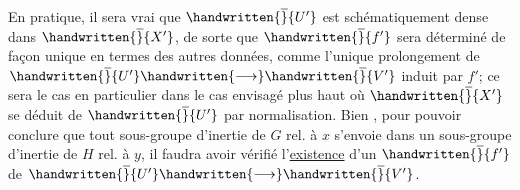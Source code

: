 
En pratique, il sera vrai que $\handwritten{\overline}{U'}$ est schématiquement dense dans $\handwritten{\overline}{X'}$, de sorte que $\handwritten{\overline}{f'}$ sera déterminé de façon unique en termes des autres données, comme l'unique prolongement de $\handwritten{\overline}{U'}\handwritten{\longrightarrow}\handwritten{\overline}{V'}$ induit par $f'$; ce sera le cas en particulier dans le cas envisagé plus haut où $\handwritten{\overline}{X'}$ se déduit de  $\handwritten{\overline}{U'}$ par normalisation. Bien , pour pouvoir conclure que tout sous-groupe d'inertie de $G$ rel. à $x$ s'envoie dans un sous-groupe d'inertie de $H$ rel. à $y$, il faudra avoir vérifié l'\uline{existence} d'un  $\handwritten{\overline}{f'}$ de $\handwritten{\overline}{U'}\handwritten{\longrightarrow}\handwritten{\overline}{V'}$. 

